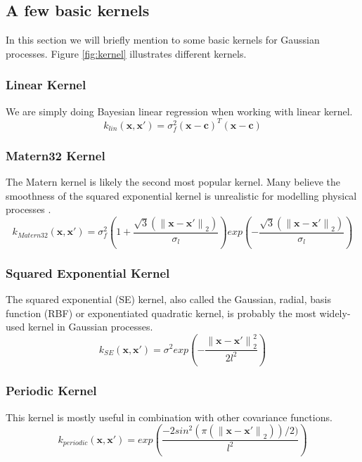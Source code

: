 \subsection{A few basic kernels}
In this section we will briefly mention to some basic kernels for Gaussian processes. Figure \ref{fig:kernel} illustrates different kernels.
\subsubsection{Linear Kernel}
We are simply doing Bayesian linear regression when working with linear kernel.
\begin{equation}
k_{lin}(\textbf{x},\textbf{x}') = \sigma_f^2(\textbf{x}-\textbf{c})^T (\textbf{x}-\textbf{c})
\end{equation}

\subsubsection{Matern32 Kernel}
The Matern kernel is likely the second most popular kernel. Many believe the smoothness of the squared exponential kernel is unrealistic for modelling physical processes \cite{rasmussen2006gaussian}.
\begin{equation}
k_{Matern32}(\textbf{x},\textbf{x}') = \sigma_f^2(1+\frac{\sqrt{3}({\lVert \textbf{x} - \textbf{x}' \lVert}_2)}{\sigma_l}) exp(-\frac{\sqrt{3}({\lVert \textbf{x} - \textbf{x}' \lVert}_2)}{\sigma_l})
\end{equation}

\subsubsection{Squared Exponential Kernel}
The squared exponential (SE) kernel, also called the Gaussian, radial, basis function (RBF) or exponentiated quadratic kernel, is probably the most widely-used kernel in Gaussian processes.
\begin{equation}
k_{SE}(\textbf{x},\textbf{x}') = \sigma^2 exp(-\frac{{\lVert \textbf{x} - \textbf{x}' \lVert}_2^2}{2l^2})
\end{equation}

\subsubsection{Periodic Kernel}
This kernel is mostly useful in combination with other covariance functions.
\begin{equation}
k_{periodic}(\textbf{x},\textbf{x}') = exp(\frac{-2 sin^2 (\pi({\lVert \textbf{x} - \textbf{x}' \lVert}_2))/2)}{l^2})
\end{equation}

